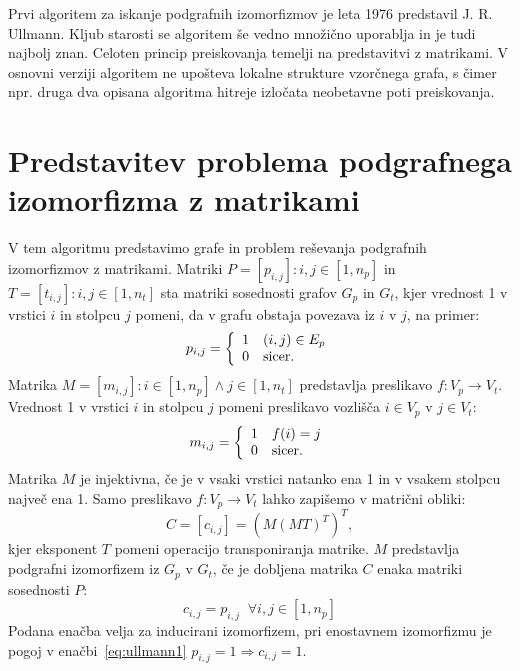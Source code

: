 \documentclass[a4paper, 12pt, ]{book}
\newcommand{\TODO}[1]{\textcolor{red}{#1}}
\begin{document}
	Prvi algoritem za iskanje podgrafnih izomorfizmov je leta 1976 predstavil J. R. Ullmann. Kljub starosti se algoritem še vedno množično uporablja
	in je tudi najbolj znan. Celoten princip preiskovanja temelji na predstavitvi z matrikami. V osnovni verziji algoritem ne upošteva lokalne strukture
	vzorčnega grafa, s čimer npr. druga dva opisana algoritma hitreje izločata neobetavne poti preiskovanja.
	
	\section{Predstavitev problema podgrafnega izomorfizma z matrikami}
	V tem algoritmu predstavimo grafe in problem reševanja podgrafnih izomorfizmov z matrikami. Matriki $P = [p_{i,j}] : i, j \in [1, n_p]$ in
	$T = [t_{i,j}] : i, j \in [1, n_t]$ sta matriki sosednosti grafov $G_p$ in $G_t$, kjer vrednost 1 v vrstici $i$ in stolpcu $j$ pomeni, 
	da v grafu obstaja povezava iz $i$ v $j$, na primer:
		\begin{equation}
		 	p_{i,j} = \left\{
			\begin{array}{l l}
			    1 & (i,j) \in E_p\\
			    0 & \text{sicer.}
			\end{array} \right.
		\end{equation}
	Matrika $M = [m_{i,j}]:  i \in [1, n_p] \wedge j \in [1, n_t]$ predstavlja preslikavo $f: V_p \to V_t$. Vrednost 1 v vrstici $i$ in stolpcu $j$ 
	pomeni preslikavo vozlišča
	$i \in V_p$ v $j \in V_t$:
		\begin{equation}
			m_{i,j} = \left\{
			\begin{array}{l l}
			    1 & f(i) = j\\
			    0 & \text{sicer.}
			\end{array} \right.
		\end{equation}
	Matrika $M$ je injektivna, če je v vsaki vrstici natanko ena 1 in v vsakem stolpcu največ ena 1. Samo preslikavo $f: V_p \to V_t$ lahko zapišemo v
	matrični obliki:
		\begin{equation}
			C = [c_{i,j}] = (M(MT)^T)^T,
		\end{equation}
	kjer eksponent $T$ pomeni operacijo transponiranja matrike. $M$ predstavlja podgrafni izomorfizem iz $G_p$ v $G_t$, če je dobljena matrika $C$
	enaka matriki sosednosti $P$:
		\begin{equation}
			\label{eq:ullmann1}
			c_{i,j} = p_{i,j}\;\; \forall i,j \in [1, n_p]
		\end{equation}	 
	Podana enačba velja za inducirani izomorfizem, pri enostavnem izomorfizmu je pogoj v enačbi~\ref{eq:ullmann1} $p_{i,j} = 1 \Rightarrow c_{i, j} = 1$.
	
\end{document}

